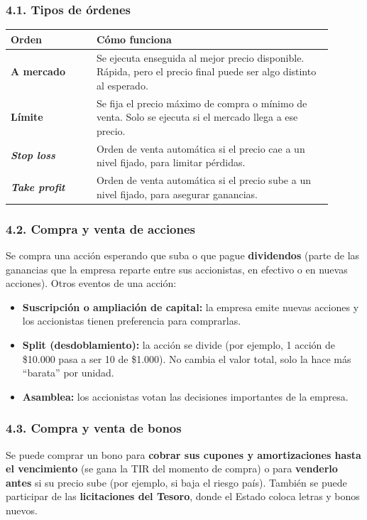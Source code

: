 \subsubsection*{4.1. Tipos de órdenes}
\begin{center}
\small
\begin{tabular}{|p{0.24\linewidth}|p{0.66\linewidth}|}
\hline
\textbf{Orden} & \textbf{Cómo funciona} \\ \hline
\textbf{A mercado} & Se ejecuta enseguida al mejor precio disponible. Rápida, pero el precio
final puede ser algo distinto al esperado. \\ \hline
\textbf{Límite} & Se fija el precio máximo de compra o mínimo de venta. Solo se ejecuta si el
mercado llega a ese precio. \\ \hline
\textbf{\textit{Stop loss}} & Orden de venta automática si el precio cae a un nivel fijado, para
limitar pérdidas. \\ \hline
\textbf{\textit{Take profit}} & Orden de venta automática si el precio sube a un nivel fijado,
para asegurar ganancias. \\ \hline
\end{tabular}
\end{center}

\subsubsection*{4.2. Compra y venta de acciones}
Se compra una acción esperando que suba o que pague \textbf{dividendos} (parte de las ganancias
que la empresa reparte entre sus accionistas, en efectivo o en nuevas acciones). Otros eventos
de una acción:
\begin{itemize}
  \item \textbf{Suscripción o ampliación de capital:} la empresa emite nuevas acciones y los
        accionistas tienen preferencia para comprarlas.
  \item \textbf{Split (desdoblamiento):} la acción se divide (por ejemplo, 1 acción de \$10.000
        pasa a ser 10 de \$1.000). No cambia el valor total, solo la hace más ``barata'' por
        unidad.
  \item \textbf{Asamblea:} los accionistas votan las decisiones importantes de la empresa.
\end{itemize}

\subsubsection*{4.3. Compra y venta de bonos}
Se puede comprar un bono para \textbf{cobrar sus cupones y amortizaciones hasta el vencimiento}
(se gana la TIR del momento de compra) o para \textbf{venderlo antes} si su precio sube (por
ejemplo, si baja el riesgo país). También se puede participar de las \textbf{licitaciones del
Tesoro}, donde el Estado coloca letras y bonos nuevos.

